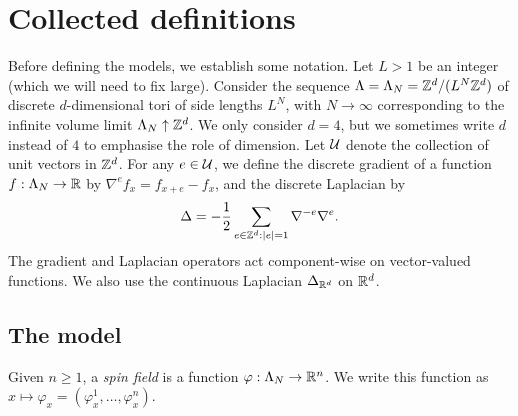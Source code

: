 \section{Collected definitions}

Before defining the models, we establish some notation.
Let $L > 1$ be an integer (which we will need to fix large).
Consider the sequence $\Lambda=\Lambda_N = {\mathbb Z}^d/(L^N{\mathbb Z}^d)$ of
discrete $d$-dimensional tori of side lengths $L^N$,
with $N \to \infty$ corresponding to the infinite volume limit $\Lambda_N \uparrow {\mathbb Z}^d$.
We only consider $d=4$, but we sometimes write $d$ instead of $4$
to emphasise the role of dimension.
Let $\mathcal{U}$ denote the collection of unit vectors in ${ {{\mathbb Z}}^d }$. %
For any $e \in \mathcal{U}$, %
we define the discrete gradient of a function $f:\Lambda_N \rightarrow {\mathbb R}$
by $\nabla^e f_x = f_{x + e} - f_x$, and
the discrete Laplacian by
\begin{equation}
\label{e:DeltaLambda}
\Delta = -\frac{1}{2}\sum_{e\in{\mathbb Z}^d:|e| = 1}\nabla^{-e} \nabla^{e}.
\end{equation}
The gradient and Laplacian operators act component-wise on vector-valued functions.
We also use the
continuous Laplacian $\Delta_{{ {{\mathbb R}}^d}}$ on ${ {{\mathbb R}}^d}$.

\subsection{The \texorpdfstring{\phifour}{phi4} model}


Given $n \ge 1$,
a \emph{spin field} is a function $\varphi : \Lambda_N \rightarrow {\mathbb R}^n$.
We write this function as $x \mapsto \varphi_x =(\varphi_x^1,\ldots,\varphi_x^n)$.

